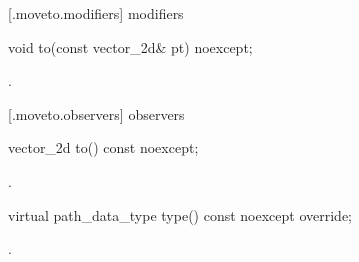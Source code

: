  [\iotwod.moveto.modifiers]{ modifiers}

\begin{itemdecl}
    void to(const vector_2d& pt) noexcept;
\end{itemdecl}
\begin{itemdescr}
	\pnum
	\postconditions
	.
	
\end{itemdescr}

 [\iotwod.moveto.observers]{ observers}

\begin{itemdecl}
    vector_2d to() const noexcept;
\end{itemdecl}
\begin{itemdescr}
	\pnum
	\returns
	.

\end{itemdescr}

\begin{itemdecl}
    virtual path_data_type type() const noexcept override;
\end{itemdecl}
\begin{itemdescr}
	\pnum
	\returns
	.

\end{itemdescr}
